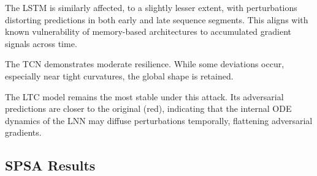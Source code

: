The LSTM is similarly affected, to a slightly lesser extent, with perturbations distorting predictions in both early and late sequence segments. This aligns with known vulnerability of memory-based architectures to accumulated gradient signals across time.

The TCN demonstrates moderate resilience. While some deviations occur, especially near tight curvatures, the global shape is retained.

The LTC model remains the most stable under this attack. Its adversarial predictions are closer to the original (red), indicating that the internal ODE dynamics of the LNN may diffuse perturbations temporally, flattening adversarial gradients.

\subsection*{SPSA Results}

